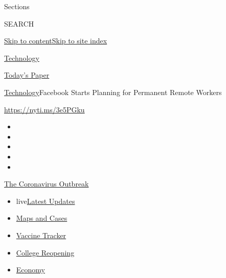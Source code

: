Sections

SEARCH

\protect\hyperlink{site-content}{Skip to
content}\protect\hyperlink{site-index}{Skip to site index}

\href{https://www.nytimes.com/section/technology}{Technology}

\href{https://myaccount.nytimes.com/auth/login?response_type=cookie\&client_id=vi}{}

\href{https://www.nytimes.com/section/todayspaper}{Today's Paper}

\href{/section/technology}{Technology}\textbar{}Facebook Starts Planning
for Permanent Remote Workers

\url{https://nyti.ms/3e5PGku}

\begin{itemize}
\item
\item
\item
\item
\item
\end{itemize}

\href{https://www.nytimes.com/news-event/coronavirus?action=click\&pgtype=Article\&state=default\&region=TOP_BANNER\&context=storylines_menu}{The
Coronavirus Outbreak}

\begin{itemize}
\tightlist
\item
  live\href{https://www.nytimes.com/2020/08/03/world/coronavirus-covid-19.html?action=click\&pgtype=Article\&state=default\&region=TOP_BANNER\&context=storylines_menu}{Latest
  Updates}
\item
  \href{https://www.nytimes.com/interactive/2020/us/coronavirus-us-cases.html?action=click\&pgtype=Article\&state=default\&region=TOP_BANNER\&context=storylines_menu}{Maps
  and Cases}
\item
  \href{https://www.nytimes.com/interactive/2020/science/coronavirus-vaccine-tracker.html?action=click\&pgtype=Article\&state=default\&region=TOP_BANNER\&context=storylines_menu}{Vaccine
  Tracker}
\item
  \href{https://www.nytimes.com/2020/08/02/us/covid-college-reopening.html?action=click\&pgtype=Article\&state=default\&region=TOP_BANNER\&context=storylines_menu}{College
  Reopening}
\item
  \href{https://www.nytimes.com/live/2020/08/03/business/stock-market-today-coronavirus?action=click\&pgtype=Article\&state=default\&region=TOP_BANNER\&context=storylines_menu}{Economy}
\end{itemize}

